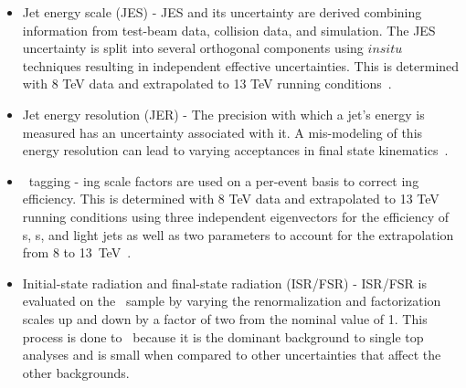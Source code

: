 \begin{itemize}

\item Jet energy scale (JES) - JES  and  its  uncertainty  are  derived  combining  information from test-beam data, collision data, and simulation. The JES uncertainty is split into several orthogonal components using $in situ$ techniques resulting in independent effective uncertainties. This is determined with 8 TeV data and extrapolated to 13 TeV running conditions~\cite{ATL-PHYS-PUB-2015-015}.

\item Jet energy resolution (JER) - The precision with which a jet's energy is measured has an uncertainty associated with it. A mis-modeling of this energy resolution can lead to varying acceptances in final state kinematics~\cite{ATL-PHYS-PUB-2015-015,JERWiki}.

\item \bjet~tagging - \btag ing scale factors are used on a per-event basis to correct \btag ing efficiency. This is determined with 8 TeV data and extrapolated to 13 TeV running conditions using three independent eigenvectors for the efficiency of \bjet s, \cjet s, and light jets as well as two parameters to account for the extrapolation from 8 to 13~TeV~\cite{Aad:2015ydr}.


\item Initial-state radiation and final-state radiation (ISR/FSR) - ISR/FSR is evaluated on the \TTB~sample by varying the renormalization and factorization scales up and down by a factor of two from the nominal value of 1. This process is done to \TTB~because it is the dominant background to single top analyses and is small when compared to other uncertainties that affect the other backgrounds. 



\end{itemize}
